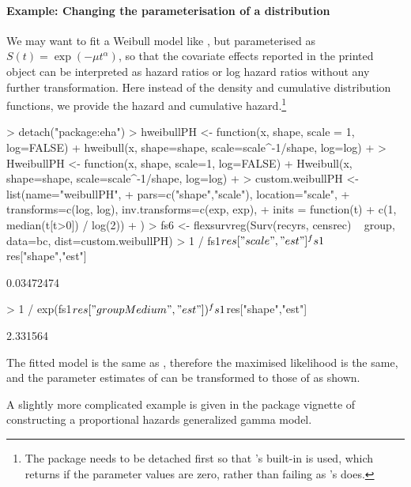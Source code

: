 \documentclass[nojss,nofooter]{jss}
\begin{document}
\paragraph{Example: Changing the parameterisation of a distribution}

We may want to fit a Weibull model like , but parameterised as $S(t) =
\exp(-\mu t^\alpha)$, so that the covariate effects reported in the
printed  object can be interpreted as hazard ratios
or log hazard ratios without any further transformation.
Here instead of the density and cumulative distribution functions, we
provide the hazard and cumulative hazard.\footnote{The  package 
needs to be detached first so that 's built-in  is used, which returns  if the parameter values are zero, rather than failing as 's does.}
\begin{Schunk}
\begin{Sinput}
> detach("package:eha")
> hweibullPH <- function(x, shape, scale = 1, log=FALSE){
+     hweibull(x, shape=shape, scale=scale^{-1/shape}, log=log)
+ }
> HweibullPH <- function(x, shape, scale=1, log=FALSE){
+     Hweibull(x, shape=shape, scale=scale^{-1/shape}, log=log)
+ }
> custom.weibullPH <- list(name="weibullPH", 
+                          pars=c("shape","scale"), location="scale",
+                          transforms=c(log, log), inv.transforms=c(exp, exp),
+                          inits = function(t){
+                              c(1, median(t[t>0]) / log(2))
+                          })
> fs6 <- flexsurvreg(Surv(recyrs, censrec) ~ group, data=bc, dist=custom.weibullPH)
> 1 / fs1$res["scale","est"]^fs1$res["shape","est"]
\end{Sinput}
\begin{Soutput}
[1] 0.03472474
\end{Soutput}
\begin{Sinput}
> 1 / exp(fs1$res["groupMedium","est"]) ^ fs1$res["shape","est"]
\end{Sinput}
\begin{Soutput}
[1] 2.331564
\end{Soutput}
\end{Schunk}
The fitted model is the same as , therefore the maximised likelihood is the same,
and the parameter estimates of  can be transformed to those of  as shown.

A slightly more complicated example is given in the package vignette
 of constructing a proportional hazards
generalized gamma model.
\end{document}
